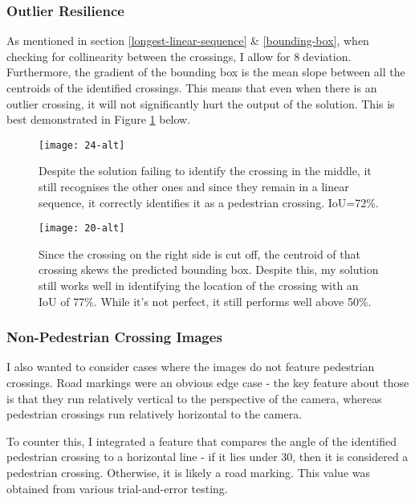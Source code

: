 \documentclass{article}  %
\begin{document}
	\subsubsection{Outlier Resilience}
	
	As mentioned in section \ref{longest-linear-sequence} \& \ref{bounding-box}, when checking for collinearity between the crossings, I allow for 8\textdegree $\;$deviation. Furthermore, the gradient of the bounding box is the mean slope between all the centroids of the identified crossings. This means that even when there is an outlier crossing, it will not significantly hurt the output of the solution. This is best demonstrated in Figure \ref{outlier-image} below.
	
	\begin{figure}[H]
		\begin{minipage}[c]{0.45\linewidth}
			\centering
			\texttt{[image: 24-alt]}
			\caption{Despite the solution failing to identify the crossing in the middle, it still recognises the other ones and since they remain in a linear sequence, it correctly identifies it as a pedestrian crossing. IoU=72\%.}
		\end{minipage}\hfill
		\begin{minipage}[c]{0.45\linewidth}
			\centering
			\texttt{[image: 20-alt]}
			\caption{Since the crossing on the right side is cut off, the centroid of that crossing skews the predicted bounding box. Despite this, my solution still works well in identifying the location of the crossing with an IoU of 77\%. While it's not perfect, it still performs well above 50\%.}
			\label{outlier-image}
		\end{minipage}
	\end{figure}
	
	\subsubsection{Non-Pedestrian Crossing Images}
	
	I also wanted to consider cases where the images do not feature pedestrian crossings. Road markings were an obvious edge case - the key feature about those is that they run relatively vertical to the perspective of the camera, whereas pedestrian crossings run relatively horizontal to the camera.
	
	To counter this, I integrated a feature that compares the angle of the identified pedestrian crossing to a horizontal line - if it lies under 30\textdegree , then it is considered a pedestrian crossing. Otherwise, it is likely a road marking. This value was obtained from various trial-and-error testing.
	
\end{document}
